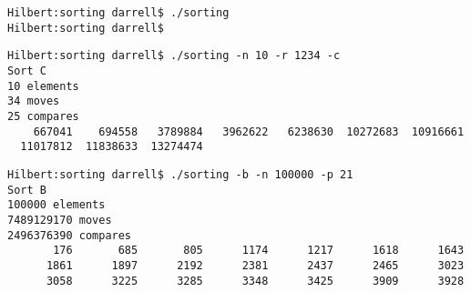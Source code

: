\documentclass{article}
\begin{document}
\begin{lstlisting}
Hilbert:sorting darrell$ ./sorting
Hilbert:sorting darrell$
\end{lstlisting}

\begin{lstlisting}
Hilbert:sorting darrell$ ./sorting -n 10 -r 1234 -c
Sort C
10 elements
34 moves
25 compares
    667041    694558   3789884   3962622   6238630  10272683  10916661
  11017812  11838633  13274474
\end{lstlisting}

\begin{lstlisting}
Hilbert:sorting darrell$ ./sorting -b -n 100000 -p 21
Sort B
100000 elements
7489129170 moves
2496376390 compares
       176       685       805      1174      1217      1618      1643
      1861      1897      2192      2381      2437      2465      3023
      3058      3225      3285      3348      3425      3909      3928
\end{lstlisting}
\end{document}
